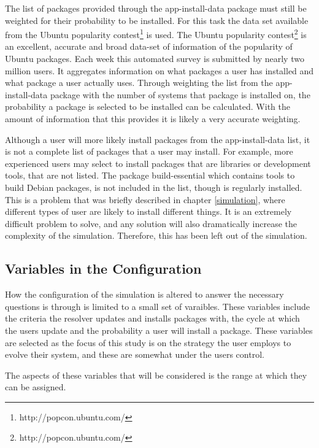 The list of packages provided through the app-install-data package must still be weighted for their probability to be installed.
For this task the data set available from the Ubuntu popularity contest\footnote{http://popcon.ubuntu.com/} is used.
The Ubuntu popularity contest\footnote{http://popcon.ubuntu.com/} is an excellent, accurate and broad data-set of information of the popularity of Ubuntu packages.
Each week this automated survey is submitted by nearly two million users.
It aggregates information on what packages a user has installed and what package a user actually uses.
Through weighting the list from the app-install-data package with the number of systems that package is installed on,
the probability a package is selected to be installed can be calculated.
With the amount of information that this provides it is likely a very accurate weighting.

Although a user will more likely install packages from the app-install-data list, it is not a complete list of packages that a user may install. 
For example, more experienced users may select to install packages that are libraries or development tools, that are not listed.
The package build-essential which contains tools to build Debian packages, is not included in the list, though is regularly installed.
This is a problem that was briefly described in chapter \ref{simulation}, where different types of user are likely to install different things.
It is an extremely difficult problem to solve, and any solution will also dramatically increase the complexity of the simulation.
Therefore, this has been left out of the simulation. 

\subsection{Variables in the Configuration}
How the configuration of the simulation is altered to answer the necessary questions is through is limited to a small set of varaibles.
These variables include the criteria the resolver updates and installs packages with,
the cycle at which the users update and the probability a user will install a package.
These variables are selected as the focus of this study is on the strategy the user employs to evolve their system,
and these are somewhat under the users control.

The aspects of these variables that will be considered is the range at which they can be assigned.


